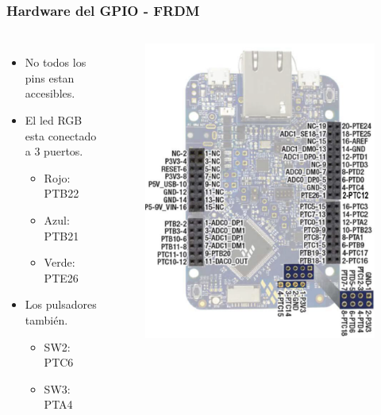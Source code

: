 \documentclass[10.5pt,scale=1.0,t,aspectratio=169,hyperref={pdfpagelabels=false}]{beamer}
\begin{document}
\begin{frame}
	\frametitle{Hardware del GPIO - FRDM}
	\begin{columns}
		\begin{itemize}
			\item No todos los pins estan accesibles.  
			\item El led RGB esta conectado a 3 puertos.
			\begin{itemize}
				\item Rojo: PTB22
				\item Azul: PTB21
				\item Verde: PTE26
			\end{itemize}
			\item Los pulsadores también. 
			\begin{itemize}
				\item SW2: PTC6
				\item SW3: PTA4
			\end{itemize}
		\end{itemize}
		
		\begin{figure}
			\centering
			\includegraphics[scale=0.4]{05_GPIOPortsFRDM}
		\end{figure}
	\end{columns}
\end{frame}
\end{document}
